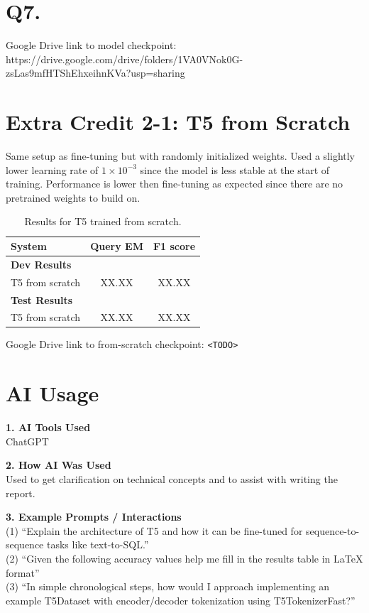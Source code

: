 \documentclass{article}
\begin{document}
\section*{Q7.}

Google Drive link to model checkpoint:
 https://drive.google.com/drive/folders/1VA0VNok0G-zsLas9mfHTShEhxeihnKVa?usp=sharing

\section*{Extra Credit 2-1: T5 from Scratch}

Same setup as fine-tuning but with randomly initialized weights. Used a slightly lower learning rate of $1 \times 10^{-3}$ since the model is less stable at the start of training. Performance is lower then fine-tuning as expected since there are no pretrained weights to build on.

\begin{table}[h!]
\centering
\begin{tabular}{lcc}
  \toprule
  System & Query EM & F1 score \\
  \midrule
  \multicolumn{3}{l}{\textbf{Dev Results}} \\
  \midrule
  T5 from scratch & XX.XX & XX.XX \\
  \midrule
  \multicolumn{3}{l}{\textbf{Test Results}} \\
  \midrule
  T5 from scratch & XX.XX & XX.XX \\
  \bottomrule
\end{tabular}
\caption{Results for T5 trained from scratch.}
\end{table}

Google Drive link to from-scratch checkpoint: \texttt{<TODO>}

\section*{AI Usage}

\noindent\textbf{1. AI Tools Used} \\
ChatGPT \\
\hrulefill

\noindent\textbf{2. How AI Was Used} \\
Used to get clarification on technical concepts and to assist with writing the report. \\
\hrulefill

\noindent\textbf{3. Example Prompts / Interactions} \\
(1) ``Explain the architecture of T5 and how it can be fine-tuned for sequence-to-sequence tasks like text-to-SQL.'' \\
(2) ``Given the following accuracy values help me fill in the results table in LaTeX format'' \\
(3) ``In simple chronological steps, how would I approach implementing an example T5Dataset with encoder/decoder tokenization using T5TokenizerFast?'' \\
\hrulefill
\end{document}
